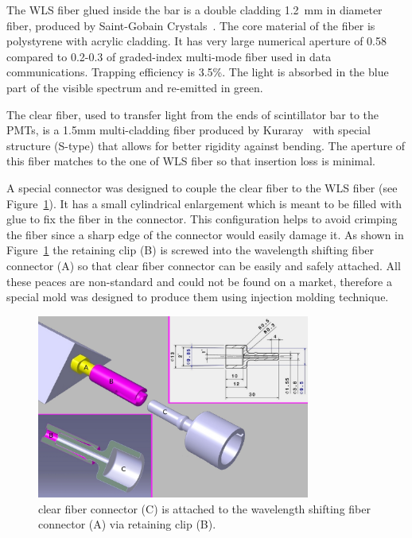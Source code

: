 \documentclass[a4paper,11pt]{article}
\begin{document}
The WLS fiber glued inside the bar is a double cladding 1.2~mm in diameter fiber, produced by Saint-Gobain Crystals~\cite{saintgobain}.
The core material of the fiber is polystyrene with acrylic cladding. It has very large numerical aperture of 0.58 compared to 0.2-0.3
of graded-index multi-mode fiber used in data communications. Trapping efficiency is 3.5\%. The light is absorbed in the blue part of
the visible spectrum and re-emitted in green. 

The clear fiber, used to transfer light from the ends of scintillator bar to the PMTs, is a 1.5mm multi-cladding fiber produced by 
Kuraray~\cite{kuraray} with special structure (S-type) that allows for better rigidity against bending. The aperture of this fiber matches
to the one of WLS fiber so that insertion loss is minimal.

A special connector was designed to couple the clear fiber to the WLS fiber (see Figure~\ref{fig:fiber_connectors_cad}). It has a small
cylindrical enlargement which is meant to be filled with glue to fix the fiber in the connector. This configuration helps
to avoid crimping the fiber since a sharp edge of the connector would easily damage it. As shown in Figure~\ref{fig:fiber_connectors_cad}
the retaining clip (B) is screwed into the wavelength shifting fiber connector (A) so that clear fiber connector can be easily and safely
attached. All these peaces are non-standard and could not be found on a market, therefore a special mold was designed to produce them using
injection molding technique. 

\begin{figure}[htp!]
 \centering
 \includegraphics[width=0.8\textwidth]{./fiber_connectors_cad}
 \caption[Clear fiber connector]{clear fiber connector (C) is attached to the wavelength shifting fiber connector (A) via retaining clip (B).}
 \label{fig:fiber_connectors_cad}
\end{figure}
\end{document}
